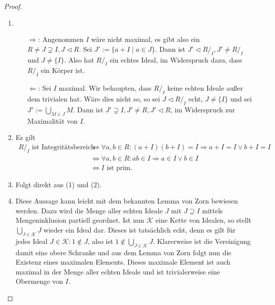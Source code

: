 \begin{proof}{\ }
    \begin{enumerate}
        \item \begin{itemize}
            \item[$\Rightarrow$:] Angenommen $I$ wäre nicht maximal, es gibt also ein $R \neq J \supsetneq I, J \vartriangleleft R$.
            Sei $J' := \{ a + I \mid a \in J \}$. Dann ist $J' \vartriangleleft R/_I, J' \neq R/_I$ und $J \neq \{I\}$. Also hat $R/_I$ ein echtes Ideal, im Widerspruch dazu, dass $R/_I$ ein Körper ist.
            \item[$\Leftarrow$:] Sei $I$ maximal. Wir behaupten, dass $R/_I$ keine echten Ideale außer dem trivialen hat. Wäre dies nicht so, so sei $J \vartriangleleft R/_I$ echt, $J \neq \{I\}$ und sei $J' := \bigcup_{M \in J} M$. Dann ist $J' \supsetneq I, J' \neq R, J' \vartriangleleft R$, im Widerspruch zur Maximalität von $I$.
        \end{itemize}
        \item Es gilt
        \begin{align*}
            R/_I \text{ ist Integritätsbereich} &\Leftrightarrow \forall a, b \in R: (a + I)(b + I) = I \Rightarrow a + I = I \lor b + I = I \\
            &\Leftrightarrow \forall a, b \in R: ab \in I \Rightarrow a \in I \lor b \in I \\
            &\Leftrightarrow I \text{ ist prim}.
        \end{align*}
        \item Folgt direkt aus (1) und (2).
        \item Diese Aussage kann leicht mit dem bekannten Lemma von Zorn bewiesen werden.
        Dazu wird die Menge aller echten Ideale $J$ mit $J\supseteq I$ mittels Mengeninklusion partiell geordnet.
        Ist nun $\mathcal{K}$ eine Kette von Idealen, so stellt $\bigcup_{J\in\mathcal{K}}J$ wieder ein Ideal dar.
        Dieses ist tatsächlich echt, denn es gilt für jedes Ideal $J\in\mathcal{K}:1\not\in J$,
        also ist $1\not\in\bigcup_{J\in\mathcal{K}}J$. Klarerweise ist die Vereinigung damit eine obere Schranke und aus dem Lemma
        von Zorn folgt nun die Existenz eines maximalen Elements. Dieses maximale Element ist auch maximal in der Menge
        aller echten Ideale und ist trivialerweise eine Obermenge von $I$.
    \end{enumerate}
\end{proof}

